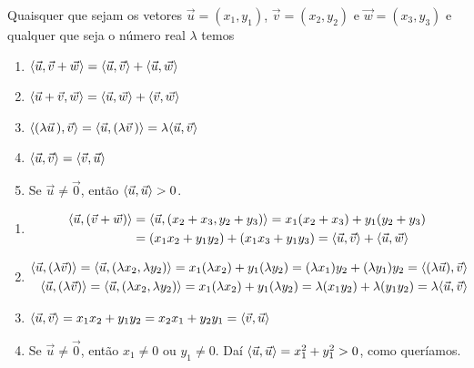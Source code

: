 \begin{proposicao}\label{propriedades-produto-interno}
    Quaisquer que sejam os vetores $\vec{u} = (x_1, y_1)$, $\vec{v} = (x_2, y_2)$ e $\vec{w} = (x_3, y_3)$ e qualquer que seja o número real $\lambda$ temos
    \begin{enumerate}[label=({\roman*})]
        \item\label{linearidade-produto-interno} $\langle \vec{u}, \vec{v} + \vec{w}\rangle = \langle \vec{u}, \vec{v} \rangle + \langle \vec{u}, \vec{w} \rangle$
        \item $\langle \vec{u} + \vec{v}, \vec{w}\rangle = \langle \vec{u}, \vec{w} \rangle + \langle \vec{v}, \vec{w} \rangle$
        \item\label{linearidade2-produto-interno} $\langle (\lambda \vec{u}\,), \vec{v}\rangle = \langle \vec{u}, (\lambda \vec{v}\,)\rangle = \lambda\langle \vec{u}, \vec{v} \rangle$
        \item $\langle \vec{u}, \vec{v} \rangle = \langle \vec{v}, \vec{u} \rangle$
        \item Se $\vec{u} \ne \vec{0}$, então $\langle \vec{u}, \vec{u} \rangle > 0$.
    \end{enumerate}
\end{proposicao}
\begin{prova}
    \begin{enumerate}[label=({\roman*})]
        \item \begin{align*}
                  \langle\vec{u}, (\vec{v} + \vec{w})\rangle & = \langle\vec{u}, (x_2 + x_3, y_2 + y_3)\rangle = x_1(x_2 + x_3) + y_1(y_2 + y_3) \\ &= (x_1x_2 + y_1y_2) + (x_1x_3 + y_1y_3) = \langle \vec{u}, \vec{v} \rangle + \langle \vec{u}, \vec{w} \rangle
              \end{align*}
        \item \begin{align*}
                  \langle\vec{u}, (\lambda\vec{v})\rangle = \langle\vec{u}, (\lambda x_2, \lambda y_2)\rangle = x_1(\lambda x_2) + y_1(\lambda y_2) = (\lambda x_1)y_2 + (\lambda y_1)y_2 = \langle(\lambda\vec{u}),\vec{v}\rangle \\
                  \langle\vec{u},(\lambda\vec{v})\rangle = \langle\vec{u}, (\lambda x_2, \lambda y_2)\rangle = x_1(\lambda x_2) + y_1(\lambda y_2) = \lambda (x_1y_2) + \lambda (y_1y_2) = \lambda\langle \vec{u}, \vec{v} \rangle
              \end{align*}
        \item $\langle \vec{u}, \vec{v} \rangle = x_1x_2 + y_1y_2 = x_2x_1 + y_2y_1 = \langle \vec{v}, \vec{u} \rangle$
        \item Se $\vec{u} \ne \vec{0}$, então $x_1 \ne 0$ ou $y_1 \ne 0$. Daí $\langle \vec{u}, \vec{u} \rangle = x_1^2 + y_1^2 > 0$, como queríamos.
    \end{enumerate}
\end{prova}

